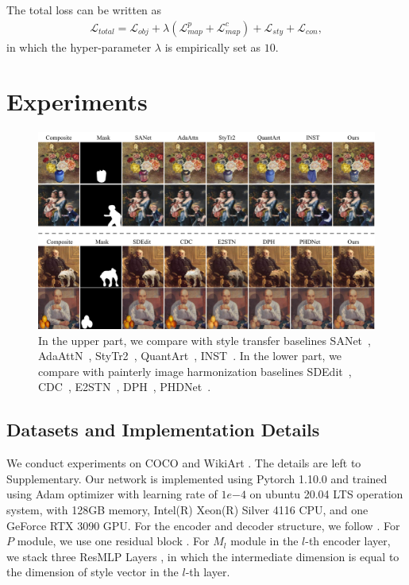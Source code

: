 \documentclass[letterpaper]{article} %
\begin{document}
The total loss can be written as
\begin{eqnarray} \label{eqn:total_loss}
\mathcal{L}_{total} = \mathcal{L}_{obj} \!+\! \lambda (\mathcal{L}_{map}^p \!+\! \mathcal{L}_{map}^c) \!+\!  \mathcal{L}_{sty} \!+\!  \mathcal{L}_{con}, %
\end{eqnarray}
in which the hyper-parameter $\lambda$ is empirically set as $10$.

\section{Experiments}

\begin{figure}[t]
\centering
\includegraphics[width=1.0\linewidth]{figures/baseline_main.jpg}
\caption{In the upper part, we compare with style transfer baselines SANet~\cite{park2019arbitrary}, AdaAttN~\cite{liu2021adaattn}, StyTr2~\cite{deng2022stytr2}, QuantArt~\cite{quantart}, INST~\cite{inst}.
In the lower part, we compare with painterly image harmonization baselines SDEdit~\cite{sdedit}, CDC~\cite{cdc}, E2STN~\cite{peng2019element}, DPH~\cite{luan2018deep}, PHDNet~\cite{cao2022painterly}.
}
\label{fig:baseline_main}
\end{figure}



\subsection{Datasets and Implementation Details} \label{sec:imp_detail}

We conduct experiments on COCO \cite{lin2014microsoft} and WikiArt \cite{nichol2016painter}. The details are left to Supplementary.
Our network is implemented using Pytorch 1.10.0 and trained using Adam optimizer with learning rate of $1e{-4}$ on ubuntu 20.04 LTS operation system, with 128GB memory, Intel(R) Xeon(R) Silver 4116 CPU, and one GeForce RTX 3090 GPU. For the encoder and decoder structure, we follow \cite{cao2022painterly}. For $P$ module, we use one residual block \cite{he2016deep}. For $M_l$ module in the $l$-th encoder layer, we stack three ResMLP Layers \cite{TouvronBCCEGIJSVJ23}, in which the intermediate dimension is equal to the dimension of style vector in the $l$-th layer.
\end{document}
